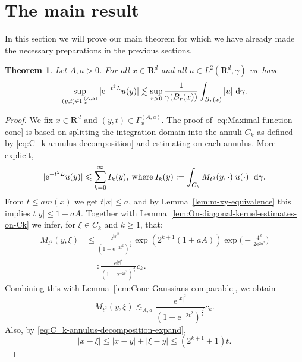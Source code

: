 \documentclass{amsart}
\newtheorem{theorem}{Theorem}
\theoremstyle{remark}
\newcommand{\D}{\,\textup{d}}
\newcommand{\LHG}{{L^2(\R^d,\gamma)}}
\renewcommand{\leq}{\leqslant}
\renewcommand{\geq}{\geqslant}
\newcommand{\R}{\mathbf R}
\newcommand{\e}{\mathrm{e}} %
\begin{document}
\section{The main result}
In this section we will prove our main theorem for which we have already made
the necessary preparations in the previous sections.
\begin{theorem}\label{thm:Gaussian-maximal-function}
  Let $A, a > 0$. For all $x \in \R^d$ and all $u \in \LHG$ we have
  \begin{equation}
    \label{eq:Maximal-function-cone}
    \sup_{(y, t) \in \Gamma_x^{(A, a)}} |\e^{-t^2 L} u(y)| \lesssim
    \sup_{r > 0} \frac1{\gamma(B_r(x))}\int_{B_r(x)} |u| \, \D\gamma.
  \end{equation}
\end{theorem}
\begin{proof}
  We fix $x \in \R^d$ and $ (y, t) \in \Gamma_x^{(A, a)}$. The proof of
  \eqref{eq:Maximal-function-cone} is based on splitting the
  integration domain into the annuli $C_k$ as defined by
  \eqref{eq:C_k-annulus-decomposition} and estimating on each annulus. More
  explicit,
  \begin{equation}
    \label{eq:Maximal-function-cone-intermediate-step-1}
    |\e^{-t^2 L} u(y)| \leq \sum_{k = 0}^\infty I_k(y),
    \:\text{where}\: I_k(y) := \int_{C_k} M_{t^2}(y, \cdot) |u(\cdot)|
    \,\D\gamma.
  \end{equation} 
  From $t \leq a m(x)$ we get $t |x| \leq a$, and by
  Lemma~\ref{lem:m-xy-equivalence} this implies $t |y| \leq 1 + aA$. Together
  with Lemma~\ref{lem:On-diagonal-kernel-estimates-on-Ck} we infer, for $\xi
  \in C_k$ and $k \geq 1$, that:
  \begin{align*}
    \label{eq:Mehler-kernel-estimate-one-sided-bound-1}
    M_{t^2}(y, \xi) &\leq \frac{\e^{|y|^2}}{(1 - \e^{-2t^2})^{\frac{d}2}}
    \exp(2^{k + 1} (1 + aA)) \exp\Big(-\frac{4^k}{2 \e^{2 a^2}} \Bigr)\\
    &=: \frac{\e^{|y|^2}}{(1 - \e^{-2t^2})^{\frac{d}2}} c_k.
  \end{align*}
  Combining this with Lemma~\ref{lem:Cone-Gaussians-comparable}, we obtain
  \begin{equation}
    \label{eq:Mehler-kernel-estimate-one-sided-bound-1}
    M_{t^2}(y, \xi) \lesssim_{A, a} \frac{\e^{|x|^2}}{(1 - \e^{-2t^2})^{\frac{d}2}} c_k.
  \end{equation}       
  Also, by \eqref{eq:C_k-annulus-decomposition-expand},
  \begin{equation*}
    |x - \xi| \leq |x - y| + |\xi - y| \leq (2^{k + 1} + 1) t .

\end{equation*}
\end{proof}
\end{document}
